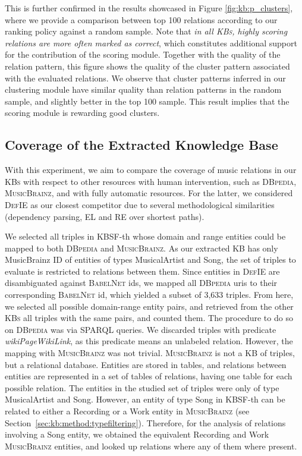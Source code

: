 This is further confirmed in the results showcased in Figure \ref{fig:kb:p_clusters}, where we provide a comparison between top 100 relations according to our ranking policy against a random sample. Note that \textit{in all \textsc{KBs}, highly scoring relations are more often marked as correct}, which constitutes additional support for the contribution of the scoring module. Together with the quality of the relation pattern, this figure shows the quality of the cluster pattern associated with the evaluated relations. We observe that cluster patterns inferred in our clustering module have similar quality than relation patterns in the random sample, and slightly better in the top 100 sample. This result implies that the scoring module is rewarding good clusters.

\subsection{Coverage of the Extracted Knowledge Base}
\label{sec:kb:experiments:coverage}

With this experiment, we aim to compare the coverage of music relations in our \textsc{KBs} with respect to other resources with human intervention, such as \textsc{DBpedia}, \textsc{MusicBrainz}, and with fully automatic resources. For the latter, we considered \textsc{DefIE} as our closest competitor due to several methodological similarities (dependency parsing, \textsc{EL} and \textsc{RE} over shortest paths). 

We selected all triples in \textsc{KBSF}-th whose domain and range entities could be mapped to both \textsc{DBpedia} and \textsc{MusicBrainz}. As our extracted \textsc{KB} has only MusicBrainz ID of entities of types MusicalArtist and Song, the set of triples to evaluate is restricted to relations between them. Since entities in \textsc{DefIE} are disambiguated against \textsc{BabelNet} ids, we mapped all \textsc{DBpedia} uris to their corresponding \textsc{BabelNet} id, which yielded a subset of 3,633 triples. From here, we selected all possible domain-range entity pairs, and retrieved from the other \textsc{KBs} all triples with the same pairs, and counted them.
The procedure to do so on \textsc{DBpedia} was via SPARQL queries.
We discarded triples with predicate \textit{wikiPageWikiLink}, as this predicate means an unlabeled relation. However, the mapping with \textsc{MusicBrainz} was not trivial. \textsc{MusicBrainz} is not a \textsc{KB} of triples, but a relational database. Entities are stored in tables, and relations between entities are represented in a set of tables of relations, having one table for each possible relation. The entities in the studied set of triples were only of type MusicalArtist and Song. However, an entity of type Song in \textsc{KBSF}-th can be related to either a Recording or a Work entity in \textsc{MusicBrainz} (see Section~\ref{sec:kb:method:typefiltering}). Therefore, for the analysis of relations involving a Song entity, we obtained the equivalent Recording and Work \textsc{MusicBrainz} entities, and looked up relations where any of them where present.

